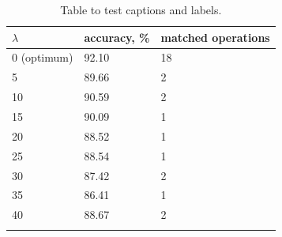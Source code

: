 \documentclass{article}
\begin{document}
\begin{table}[h   ]
	\centering
	\begin{tabular}{lll}
		\midrule
		$\lambda$     & accuracy, \% & matched operations \\
		\midrule
        0 (optimum) & 92.10 & 18 \\ 
        5  & 89.66 &  2   \\
		10  & 90.59   &  2   \\
		15 & 90.09   &  1   \\
		20 & 88.52   &  1   \\
      25 & 88.54   &  1   \\
      30 & 87.42   &  2   \\
      35 & 86.41   &  1   \\
      40 & 88.67   &  2  \\
      \hline
    \vspace{0.1cm}      
	\end{tabular}
    \caption{Table to test captions and labels.}
	\label{tab:prelim}
\end{table}
\end{document}
